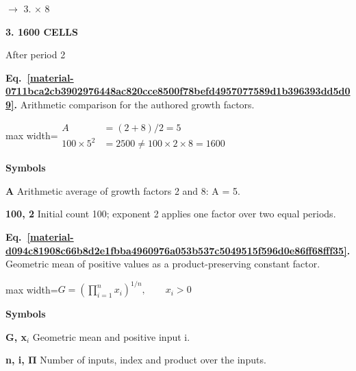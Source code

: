 \documentclass[11pt,a4paper]{article}
\begin{document}
\par\noindent $\longrightarrow$ 3. \ensuremath{\times} 8
\par\medskip\noindent\textcolor{pcd3}{\textbf{3. 1600 CELLS}}\par
After period 2


\medskip

\par\medskip
\begin{samepage}
\label{material-0711bca2cb3902976448ac820cce8500f78befd4957077589d1b396393dd5d09}
\noindent\textbf{Eq.~\ref*{material-0711bca2cb3902976448ac820cce8500f78befd4957077589d1b396393dd5d09}.} Arithmetic comparison for the authored growth factors.\par\nopagebreak
\begin{center}\begin{adjustbox}{max width=\linewidth}$\displaystyle \begin{aligned}A&=(2+8)/2=5\\100\times5^2&=2500\ne100\times2\times8=1600\end{aligned}$\end{adjustbox}\end{center}

\par\noindent\textbf{Symbols}

\par\noindent\textbf{A} Arithmetic average of growth factors 2 and 8: A = 5.

\par\noindent\textbf{100, 2} Initial count 100; exponent 2 applies one factor over two equal periods.

\end{samepage}
\medskip

\par\medskip
\begin{samepage}
\label{material-d094c81908c66b8d2e1fbba4960976a053b537c5049515f596d0e86ff68fff35}
\noindent\textbf{Eq.~\ref*{material-d094c81908c66b8d2e1fbba4960976a053b537c5049515f596d0e86ff68fff35}.} Geometric mean of positive values as a product-preserving constant factor.\par\nopagebreak
\begin{center}\begin{adjustbox}{max width=\linewidth}$\displaystyle G = \left(\prod_{i=1}^{n} x_i\right)^{1/n}, \qquad x_i > 0$\end{adjustbox}\end{center}

\par\noindent\textbf{Symbols}

\par\noindent\textbf{G, x\ensuremath{{}_i}} Geometric mean and positive input i.

\par\noindent\textbf{n, i, Π} Number of inputs, index and product over the inputs.

\end{samepage}
\medskip
\end{document}
